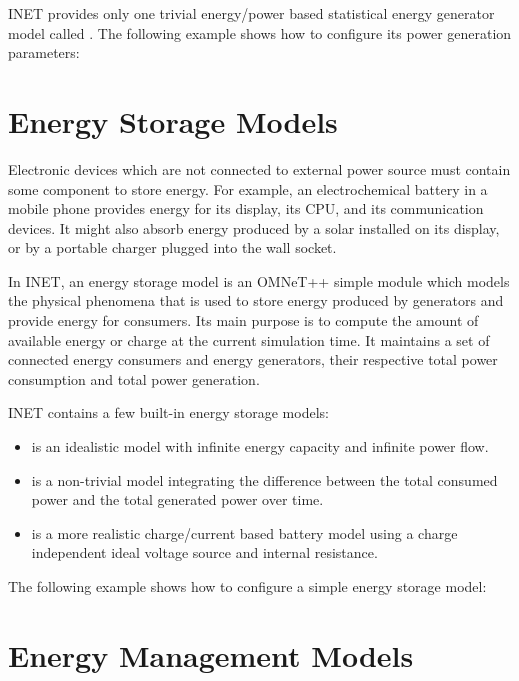 INET provides only one trivial energy/power based statistical energy
generator model called . The following
example shows how to configure its power generation parameters:


\section{Energy Storage Models}

Electronic devices which are not connected to external power source must contain 
some component to store energy. For example, an electrochemical battery in a
mobile phone provides energy for its display, its CPU, and its communication
devices. It might also absorb energy produced by a solar installed on its
display, or by a portable charger plugged into the wall socket.

In INET, an energy storage model is an OMNeT++ simple module which models
the physical phenomena that is used to store energy produced by generators
and provide energy for consumers. Its main purpose is to compute the amount
of available energy or charge at the current simulation time. It maintains
a set of connected energy consumers and energy generators, their respective
total power consumption and total power generation.

INET contains a few built-in energy storage models:

\begin{itemize}
        \item {} is an idealistic model with infinite energy capacity and infinite power flow.
        \item {} is a non-trivial model integrating the difference between the total consumed power and the total generated power over time.
        \item {} is a more realistic charge/current based battery model using a charge independent ideal voltage source and internal resistance.
\end{itemize}

The following example shows how to configure a simple energy storage model:


\section{Energy Management Models}


